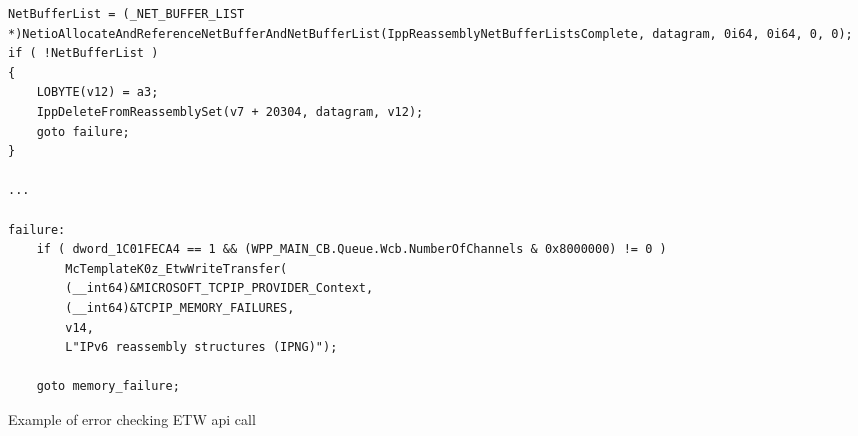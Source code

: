 \documentclass{report}
\begin{document}
\begin{listing}[H]
    \begin{verbatim}
NetBufferList = (_NET_BUFFER_LIST *)NetioAllocateAndReferenceNetBufferAndNetBufferList(IppReassemblyNetBufferListsComplete, datagram, 0i64, 0i64, 0, 0);
if ( !NetBufferList )
{
    LOBYTE(v12) = a3;
    IppDeleteFromReassemblySet(v7 + 20304, datagram, v12);
    goto failure;
}

...

failure:
    if ( dword_1C01FECA4 == 1 && (WPP_MAIN_CB.Queue.Wcb.NumberOfChannels & 0x8000000) != 0 )
        McTemplateK0z_EtwWriteTransfer(
        (__int64)&MICROSOFT_TCPIP_PROVIDER_Context,
        (__int64)&TCPIP_MEMORY_FAILURES,
        v14,
        L"IPv6 reassembly structures (IPNG)");

    goto memory_failure;
\end{verbatim}
\caption{Example of error checking \gls{ETW} api call}
\label{listing:detection:etw:error-checking-example}
\end{listing}
\end{document}
